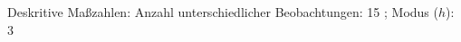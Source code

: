 				\label{tableValues:bocc243i_v1}
				\vspace*{-\baselineskip}
                    \begin{noten}
                	    \note{} Deskritive Maßzahlen:
                	    Anzahl unterschiedlicher Beobachtungen: 15%
                	    ; 
                	      Modus ($h$): 3
                     \end{noten}


